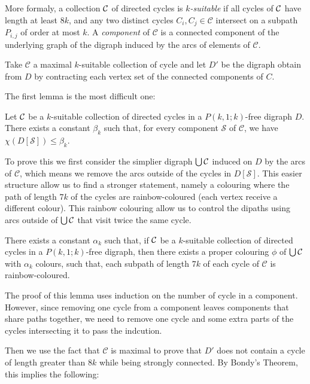 \documentclass{endm}
\begin{document}
More formaly, a collection ${\cal C}$ of directed cycles is {\it $k$-suitable} if 
all cycles of ${\cal C}$ have length at least $8k$, and
any two distinct cycles $C_i,C_j\in\mathcal C$ intersect on  a subpath $P_{i,j}$ of order at most $k$.
A \textit{component} of $\mathcal{C}$ is a connected component of the underlying graph of the digraph 
induced by the arcs of elements of $\mathcal{C}$.		

Take $\mathcal{C}$ a maximal $k$-suitable collection of cycle and let $D'$ be the digraph
obtain from $D$ by contracting each vertex set of the connected components of $C$.

The first lemma is the most difficult one:

\begin{lemma}\label{lem:DC}
Let ${\cal C}$ be a $k$-suitable collection of directed cycles in a $P(k,1;k)$-free digraph $D$.
There exists a constant $\beta_k$ such that, for every component $\mathcal{S}$ of $\mathcal{C}$, 
we have $\chi(D[\mathcal{S}]) \leq \beta_k$.
\end{lemma} 

To prove this we first consider the simplier digraph $\bigcup{\cal C}$ induced on $D$ by the arcs 
of $\mathcal{C}$, which means we remove the arcs outside of the cycles in $D[\mathcal{S}]$. This easier structure 
allow us to find a stronger statement, namely a colouring where the path of length $7k$ of the cycles are rainbow-coloured 
(each vertex receive a different colour). This rainbow colouring allow us to control the dipaths using arcs outside of 
$\bigcup{\cal C}$ that visit twice the same cycle. 

\begin{lemma}\label{lem:col-union-cycle}
There exists a constant $\alpha_k$ such that, if ${\cal C}$ be a $k$-suitable collection of directed cycles 
in a $P(k,1;k)$-free digraph, then there exists a proper colouring $\phi$ of $\bigcup{\cal C}$ with $\alpha_k$ colours, 
such that, each subpath of length $7k$ of each cycle of $\mathcal{C}$ is rainbow-coloured.
\end{lemma}

The proof of this lemma uses induction on the number of cycle in a component. However, since removing one cycle from a component
leaves components that share paths together, we need to remove one cycle and some extra parts of the cycles intersecting it to pass 
the indcution. 

Then we use the fact that $\mathcal{C}$ is maximal to
prove that $D'$ does not contain a cycle of length greater than $8k$ while being
strongly connected. By Bondy's Theorem, this implies the following:
\end{document}
